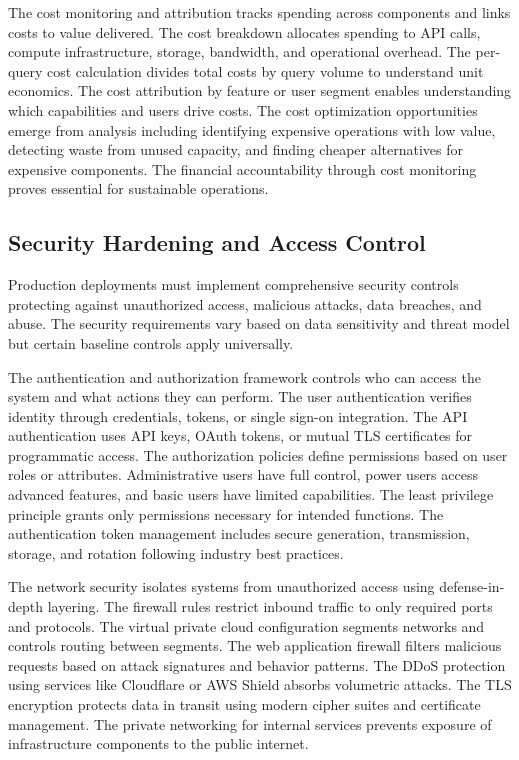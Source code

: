 The cost monitoring and attribution tracks spending across components and links costs to value delivered. The cost breakdown allocates spending to API calls, compute infrastructure, storage, bandwidth, and operational overhead. The per-query cost calculation divides total costs by query volume to understand unit economics. The cost attribution by feature or user segment enables understanding which capabilities and users drive costs. The cost optimization opportunities emerge from analysis including identifying expensive operations with low value, detecting waste from unused capacity, and finding cheaper alternatives for expensive components. The financial accountability through cost monitoring proves essential for sustainable operations.

\subsection{Security Hardening and Access Control}

Production deployments must implement comprehensive security controls protecting against unauthorized access, malicious attacks, data breaches, and abuse. The security requirements vary based on data sensitivity and threat model but certain baseline controls apply universally.

The authentication and authorization framework controls who can access the system and what actions they can perform. The user authentication verifies identity through credentials, tokens, or single sign-on integration. The API authentication uses API keys, OAuth tokens, or mutual TLS certificates for programmatic access. The authorization policies define permissions based on user roles or attributes. Administrative users have full control, power users access advanced features, and basic users have limited capabilities. The least privilege principle grants only permissions necessary for intended functions. The authentication token management includes secure generation, transmission, storage, and rotation following industry best practices.

The network security isolates systems from unauthorized access using defense-in-depth layering. The firewall rules restrict inbound traffic to only required ports and protocols. The virtual private cloud configuration segments networks and controls routing between segments. The web application firewall filters malicious requests based on attack signatures and behavior patterns. The DDoS protection using services like Cloudflare or AWS Shield absorbs volumetric attacks. The TLS encryption protects data in transit using modern cipher suites and certificate management. The private networking for internal services prevents exposure of infrastructure components to the public internet.

